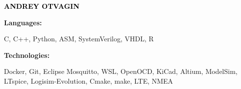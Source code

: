 \documentclass[9pt]{developercv} %
\begin{document}

\begin{minipage}[t]{0.5\textwidth} 
	\vspace{-\baselineskip} %
	
	{ \fontsize{16}{20} \textcolor{black}{\textbf{\MakeUppercase{Andrey Otvagin}}}} %
	
	\vspace{6pt}
    \hspace{12pt}

    \hspace{12pt}
    
    \hspace{12pt}

    
\end{minipage}
\hfill
\begin{minipage}[t]{0.5\textwidth}
    \vspace{-18pt}
    \vspace{-6pt}
    
    \begin{minipage}[t]{0.2\textwidth}
        \textbf{Languages:}
    \end{minipage}
    \hfill
    \begin{minipage}[t]{0.73\textwidth}
        C, C++, Python, ASM, SystemVerilog, VHDL, R
    \end{minipage}
    \vspace{4mm}
    
    \begin{minipage}[t]{0.2\textwidth}
        \textbf{Technologies:}
    \end{minipage}
    \hfill
    \begin{minipage}[t]{0.73\textwidth}
        Docker, Git, Eclipse Mosquitto, WSL, OpenOCD, KiCad, Altium, ModelSim, LTspice, Logisim-Evolution, Cmake, make, LTE, NMEA
    \end{minipage}
    
\end{minipage}
\end{document}
